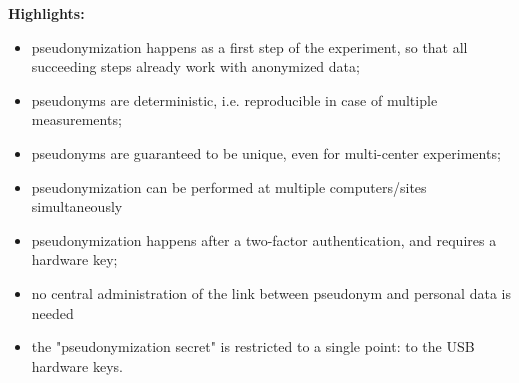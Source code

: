 \textbf{Highlights: }
\begin{itemize}
    \item pseudonymization happens as a first step of the experiment, so that all succeeding steps already work with anonymized data;
    \item pseudonyms are deterministic, i.e. reproducible in case of multiple measurements;
    \item pseudonyms are guaranteed to be unique, even for multi-center experiments;
    \item pseudonymization can be performed at multiple computers/sites simultaneously
    \item pseudonymization happens after a two-factor authentication, and requires a hardware key;
    \item no central administration of the link between pseudonym and personal data is needed
    \item the "pseudonymization secret" is restricted to a single point: to the USB hardware keys.
\end{itemize}




